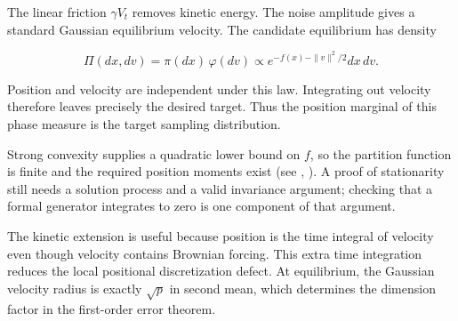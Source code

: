 \documentclass[11pt,a4paper]{article}
\begin{document}
The linear friction \(\gamma V_t\) removes kinetic energy. The noise amplitude gives a standard Gaussian equilibrium velocity.
The candidate equilibrium has density


\[\Pi(dx,dv)=\pi(dx)\,\varphi(dv)
\propto e^{-f(x)-\|v\|^2/2}dx\,dv.\]


Position and velocity are independent under this law. Integrating out velocity
therefore leaves precisely the desired target. Thus the position marginal of this phase measure is the target sampling distribution.




Strong convexity supplies a quadratic lower bound on \(f\), so the partition
function is finite and the required position moments exist (see \cite[Section~3.26.10]{LangevinLean2026ULASC}, \cite[Section~3.26.15]{LangevinLean2026ULASC}). A proof of
stationarity still needs a solution process and a valid invariance
argument; checking that a formal generator integrates to zero is one component
of that argument.



The kinetic extension is useful because position is the time integral of velocity even though velocity contains Brownian forcing. This extra time integration reduces the local positional discretization defect. At equilibrium, the Gaussian velocity radius is exactly \(\sqrt p\) in second mean, which determines the dimension factor in the first-order error theorem.
\end{document}
